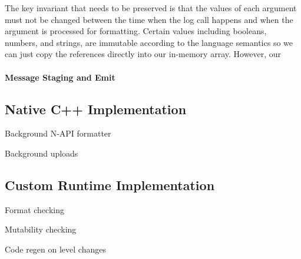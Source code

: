 The key invariant that needs to be preserved is that the values of each argument 
must not be changed between the time when the log call happens and when the 
argument is processed for formatting. Certain values including booleans, numbers, 
and strings, are immutable according to the language semantics so we can just 
copy the references directly into our in-memory array. However, our 


\paragraph{Message Staging and Emit}
\noindent

\subsection{Native C++ Implementation}

Background N-API formatter

Background uploads

\subsection{Custom Runtime Implementation}

Format checking

Mutability checking

Code regen on level changes